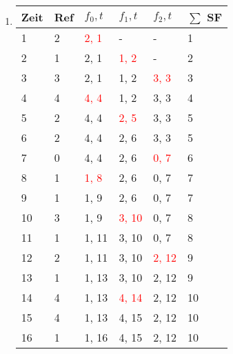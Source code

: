 \newcommand{\SF}[1]{\textcolor{red}{#1}}

\begin{enumerate}[label={Aufgabe H\arabic*},start=60]
    \item \blanko
        \begin{center}
            \begin{tabular}{llllll}
                \toprule
                Zeit & Ref & $f_0, t$ & $f_1, t$ & $f_2, t$ & $\sum$ SF \\
                \midrule
                1  & 2 & \SF{2, 1}  & -          & -          & 1 \\
                2  & 1 &     2, 1   & \SF{1, 2}  & -          & 2 \\
                3  & 3 &     2, 1   &     1, 2   & \SF{3, 3}  & 3 \\
                4  & 4 & \SF{4, 4}  &     1, 2   &     3, 3   & 4 \\
                5  & 2 &     4, 4   & \SF{2, 5}  &     3, 3   & 5 \\
                6  & 2 &     4, 4   &     2, 6   &     3, 3   & 5 \\
                7  & 0 &     4, 4   &     2, 6   & \SF{0, 7}  & 6 \\
                8  & 1 & \SF{1, 8}  &     2, 6   &     0, 7   & 7 \\
                9  & 1 &     1, 9   &     2, 6   &     0, 7   & 7 \\
                10 & 3 &     1, 9   & \SF{3, 10} &     0, 7   & 8 \\
                11 & 1 &     1, 11  &     3, 10  &     0, 7   & 8 \\
                12 & 2 &     1, 11  &     3, 10  & \SF{2, 12} & 9 \\
                13 & 1 &     1, 13  &     3, 10  &     2, 12  & 9 \\
                14 & 4 &     1, 13  & \SF{4, 14} &     2, 12  & 10 \\
                15 & 4 &     1, 13  &     4, 15  &     2, 12  & 10 \\
                16 & 1 &     1, 16  &     4, 15  &     2, 12  & 10 \\
                \bottomrule
            \end{tabular}
        \end{center}
        \vspace{\baselineskip}
        

\end{enumerate}
